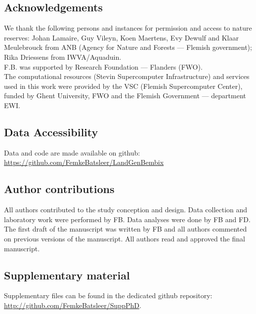 \documentclass[10pt, twoside]{book} %
\begin{document}
	
	\clearpage
	\subsection*{Acknowledgements}
	We thank the following persons and instances for permission and access to nature reserves: Johan Lamaire, Guy Vileyn, Koen Maertens, Evy Dewulf and Klaar Meulebrouck from ANB (Agency for Nature and Forests --- Flemish government); Rika Driessens from IWVA/Aquaduin.\\
	F.B. was supported by Research Foundation --- Flanders (FWO).\\
	The computational resources (Stevin Supercomputer Infrastructure) and services used in this work were provided by the VSC (Flemish Supercomputer Center), funded by Ghent University, FWO and the Flemish Government --- department EWI.
	
	\subsection*{Data Accessibility}
	Data and code are made available on github:\\
	\url{https://github.com/FemkeBatsleer/LandGenBembix}
	
	\subsection*{Author contributions}
	All authors contributed to the study conception and design. Data collection and laboratory work were performed by FB. Data analyses were done by FB and FD. The first draft of the manuscript was written by FB and all authors commented on previous versions of the manuscript. All authors read and approved the final manuscript.
	
	\subsection*{Supplementary material}
	Supplementary files can be found in the dedicated github repository: \url{http://github.com/FemkeBatsleer/SuppPhD}.

\cleardoublepage
\thispagestyle{empty}
\hbox{}
\clearpage

\newpage{\thispagestyle{empty}\clearpage}
\cleardoublepage

\ClearWallPaper

\newpage{\thispagestyle{empty}\clearpage}
\hbox{}
\clearpage
\ClearWallPaper
\end{document}
